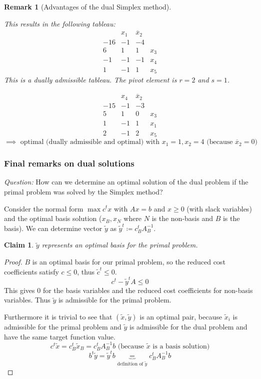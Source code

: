 \documentclass[a4paper]{article}
\numberwithin{lecref}{subsection}
\newtheorem*{Claim}{Claim}
\newtheorem*{Remark}{Remark}
\begin{document}
\begin{Remark}[Advantages of the dual Simplex method]
\begin{itemize}
			This results in the following tableau:
			\[\begin{array}{c|ccc}
				& x_1 & \overline x_2 & \\
				-16 & -1 & -4 & \\
				\hline
				6 & 1 & 1 & x_3 \\
				-1 & -1 & -1 & x_4 \\
				1 & -1 & 1 & x_5
			\end{array}\]
			This is a dually admissible tableau. The pivot element is $r=2$ and $s=1$.

			\[\begin{array}{c|ccc}
				& x_4 & \overline x_2 & \\
				-15 & -1 & -3 & \\
				\hline
				5 & 1 & 0 & x_3 \\
				1 & -1 & 1 & x_1 \\
				2 & -1 & 2 & x_5
			\end{array}\]
			\[ \implies \text{ optimal (dually admissible and optimal) with } x_1 = 1, x_2 = 4 \text{ (because $\overline x_2 = 0$)} \]
	\end{itemize}
\end{Remark}

\subsubsection{Final remarks on dual solutions}
\label{section:1.4.5}

\emph{Question:} How can we determine an optimal solution of the dual problem if the primal problem was solved by the Simplex method?

Consider the normal form $\max c^t x$ with $Ax = b$ and $x \geq 0$ (with slack variables) and the optimal basis solution ($x_B, x_N$ where $N$ is the non-basis and $B$ is the basis).
We can determine vector $\tilde y$ as $\tilde y^t \coloneqq c_B^t A_B^{-1}$.

\begin{Claim}
	$\tilde y$ represents an optimal basis for the primal problem.
\end{Claim}

\begin{proof}
	$B$ is an optimal basis for our primal problem, so the reduced cost coefficients satisfy $c \leq 0$, thus $\tilde c^t \leq 0$.
	\[ c^t - \tilde y^t A \leq 0 \]
	This gives $0$ for the basis variables and the reduced cost coefficients for non-basis variables.
	Thus $\tilde y$ is admissible for the primal problem.

	Furthermore it is trivial to see that $(\tilde x, \tilde y)$ is an optimal pair, because $\tilde x_i$ is admissible for the primal problem and $\tilde y$ is admissible for the dual problem and have the same target function value.
	\[ c^t \tilde x = c_B^t \tilde x_B = c_B^t A_B^{-1} b \text{ (because $\tilde x$ is a basis solution)} \]
	\[ b^t \tilde y = \tilde y^t b \underbrace{=}_{\text{definition of } \tilde y} c_B^t A_B^{-1} b \]
\end{proof}
\end{document}
